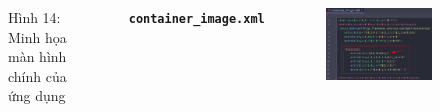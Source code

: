 \documentclass{beamer}
\begin{document}
\begin{frame}
\begin{columns}
\begin{figure}
            \caption{\centering\tiny{Hình 14: Minh họa màn hình chính của ứng dụng}}
        \end{figure}
        \indent \textbf{\texttt{container\_image.xml}}
        \begin{figure}
            \centering
            \includegraphics[width=\textwidth]{images/15.png}
        \end{figure}
    \end{columns}
\end{frame}
\end{document}
